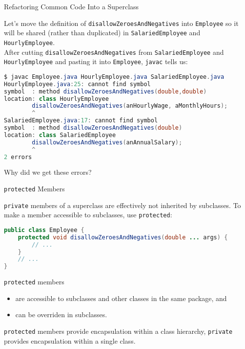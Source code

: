 \documentclass{beamer}
\begin{document}
\begin{frame}[fragile]{Refactoring Common Code Into a Superclass}


Let's move the definition of {\tt disallowZeroesAndNegatives} into {\tt Employee} so it will be shared (rather than duplicated) in {\tt SalariedEmployee} and {\tt HourlyEmployee}.\\
\vspace{.05in}
After cutting {\tt disallowZeroesAndNegatives} from {\tt SalariedEmployee} and {\tt HourlyEmployee} and pasting it into {\tt Employee}, {\tt javac} tells us:
\vspace{-.1in}
\begin{lstlisting}[language=Java]
$ javac Employee.java HourlyEmployee.java SalariedEmployee.java
HourlyEmployee.java:25: cannot find symbol
symbol  : method disallowZeroesAndNegatives(double,double)
location: class HourlyEmployee
        disallowZeroesAndNegatives(anHourlyWage, aMonthlyHours);
        ^
SalariedEmployee.java:17: cannot find symbol
symbol  : method disallowZeroesAndNegatives(double)
location: class SalariedEmployee
        disallowZeroesAndNegatives(anAnnualSalary);
        ^
2 errors
\end{lstlisting}
\vspace{-.1in}
Why did we get these errors?

\end{frame}

\begin{frame}[fragile]{{\tt protected} Members}


{\tt private} members of a superclass are effectively not inherited by subclasses.  To make a member accessible to subclasses, use {\tt protected}:
\begin{lstlisting}[language=Java]
public class Employee {
    protected void disallowZeroesAndNegatives(double ... args) {
        // ...
    }
    // ...
}
\end{lstlisting}
{\tt protected} members
\begin{itemize}
\item are accessible to subclasses and other classes in the same package, and
\item can be overriden in subclasses.
\end{itemize}
{\tt protected} members provide encapsulation within a class hierarchy, {\tt private} provides encapsulation within a single class.

\end{frame}
\end{document}
